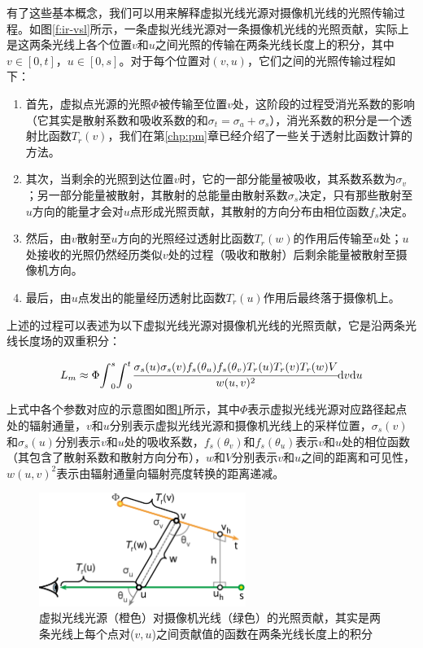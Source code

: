 有了这些基本概念，我们可以用来解释虚拟光线光源对摄像机光线的光照传输过程。如图\ref{f:ir-vsl}所示，一条虚拟光线光源对一条摄像机光线的光照贡献，实际上是这两条光线上各个位置$v$和$u$之间光照的传输在两条光线长度上的积分，其中$v\in[0,t]$，$u\in[0,s]$。对于每个位置对$(v,u)$，它们之间的光照传输过程如下：

\begin{enumerate}
	\item 首先，虚拟点光源的光照$\Phi$被传输至位置$v$处，这阶段的过程受消光系数的影响（它其实是散射系数和吸收系数的和$\sigma_t=\sigma_a+\sigma_s$），消光系数的积分是一个透射比函数$T_r(v)$，我们在第\ref{chp:pm}章已经介绍了一些关于透射比函数计算的方法。
	\item 其次，当剩余的光照到达位置$v$时，它的一部分能量被吸收，其系数系数为$\sigma_v$；另一部分能量被散射，其散射的总能量由散射系数$\sigma_s$决定，只有那些散射至$u$方向的能量才会对$u$点形成光照贡献，其散射的方向分布由相位函数$f_s$决定。
	\item 然后，由$v$散射至$u$方向的光照经过透射比函数$T_r(w)$的作用后传输至$u$处；$u$处接收的光照仍然经历类似$v$处的过程（吸收和散射）后剩余能量被散射至摄像机方向。
	\item 最后，由$u$点发出的能量经历透射比函数$T_r(u)$作用后最终落于摄像机上。
\end{enumerate}

上述的过程可以表述为以下虚拟光线光源对摄像机光线的光照贡献，它是沿两条光线长度场的双重积分：

\begin{equation}\label{e:ir-vrl}
	L_m\approx\Phi{\rm \int}^{s}_0{\rm \int}^{t}_0  \cfrac{\sigma_s(u)\sigma_s(v)f_s(\theta_u)f_s(\theta_v)T_r(u)T_r(v)T_r(w)V}{w(u,v)^{2}}{\rm d}v{\rm d}u
\end{equation}

上式中各个参数对应的示意图如图\ref{f:ir-vrl}所示，其中$\Phi$表示虚拟光线光源对应路径起点处的辐射通量，$v$和$u$分别表示虚拟光线光源和摄像机光线上的采样位置，$\sigma_s(v)$和$\sigma_s(u)$分别表示$v$和$u$处的吸收系数，$f_s(\theta_v)$和$f_s(\theta_u)$表示$v$和$u$处的相位函数（其包含了散射系数和散射方向分布），$w$和$V$分别表示$v$和$u$之间的距离和可见性，$w(u,v)^{2}$表示由辐射通量向辐射亮度转换的距离递减。

\begin{figure}
	\sidecaption
	\includegraphics[width=0.6\textwidth]{figures/ir/vrl}
	\caption{虚拟光线光源（橙色）对摄像机光线（绿色）的光照贡献，其实是两条光线上每个点对($v,u$)之间贡献值的函数在两条光线长度上的积分}
	\label{f:ir-vrl}
\end{figure}

